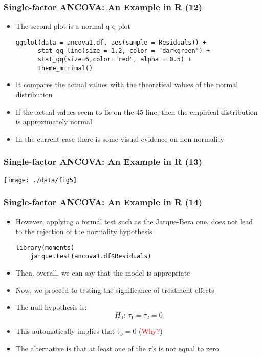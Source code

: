 \documentclass[10pt]{beamer}
\theoremstyle{definition}
\begin{document}
\begin{frame}[fragile]
\frametitle{Single-factor ANCOVA: An Example in R (12)}
\begin{itemize}
	\item The second plot is a normal q-q plot
	\begin{lstlisting}[style = rstyle, breaklines]
	ggplot(data = ancova1.df, aes(sample = Residuals)) + 
	  stat_qq_line(size = 1.2, color = "darkgreen") +
	  stat_qq(size=6,color="red", alpha = 0.5) + 
	  theme_minimal()	
	\end{lstlisting}
	\item It compares the actual values with the theoretical values of the normal distribution
	\item If the actual values seem to lie on the 45\degree -line, then the empirical distribution is approximately normal
	\item In the current case there is some visual evidence on non-normality
\end{itemize}
\end{frame}

\begin{frame}[fragile]
\frametitle{Single-factor ANCOVA: An Example in R (13)}
\centerline{\texttt{[image: ./data/fig5]}}
\end{frame}

\begin{frame}[fragile]
\frametitle{Single-factor ANCOVA: An Example in R (14)}
\begin{itemize}
	\item However, applying a formal test such as the Jarque-Bera one, does not lead to the rejection of the normality hypothesis
	\begin{lstlisting}[style = rstyle, breaklines] 
	library(moments)
	jarque.test(ancova1.df$Residuals)
	\end{lstlisting}
	\item Then, overall, we can say that the model is appropriate 
	\item Now, we proceed to testing the significance of treatment effects
	\item The null hypothesis is:
	\[
		H_{0}:\, \tau_{1} = \tau_{2} = 0
	\]
	\item This automatically implies that $\tau_{3} = 0$ (\textcolor{red}{Why?})
	\item The alternative is that at least one of the $\tau$'s is not equal to zero
\end{itemize}
\end{frame}
\end{document}
